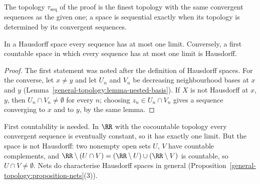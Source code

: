 The topology $\tau_{\mathrm{seq}}$ of the proof is the finest topology with the same convergent sequences as the given one; a space is sequential exactly when its topology is determined by its convergent sequences.

\begin{proposition}\label{general-topology:proposition-first-countable-hausdorff}
In a Hausdorff space every sequence has at most one limit. Conversely, a first countable space in which every sequence has at most one limit is Hausdorff.
\end{proposition}

\begin{proof}
The first statement was noted after the definition of Hausdorff spaces. For the converse, let $x \neq y$ and let $U_n$ and $V_n$ be decreasing neighbourhood bases at $x$ and $y$ (Lemma~\ref{general-topology:lemma-nested-basis}).
If $X$ is not Hausdorff at $x$, $y$, then $U_n \cap V_n \neq \emptyset$ for every $n$; choosing $z_n \in U_n \cap V_n$ gives a sequence converging to $x$ and to $y$, by the same lemma.
\end{proof}

\begin{counterexample}\label{general-topology:counterexample-unique-limits}
First countability is needed. In $\RR$ with the cocountable topology every convergent sequence is eventually constant, so it has exactly one limit. But the space is not Hausdorff: two nonempty open sets $U$, $V$ have
countable complements, and $\RR \setminus (U \cap V) = (\RR \setminus U) \cup (\RR \setminus V)$ is countable, so $U \cap V \neq \emptyset$. Nets do characterise Hausdorff spaces in general
(Proposition~\ref{general-topology:proposition-nets}(3)).
\end{counterexample}

